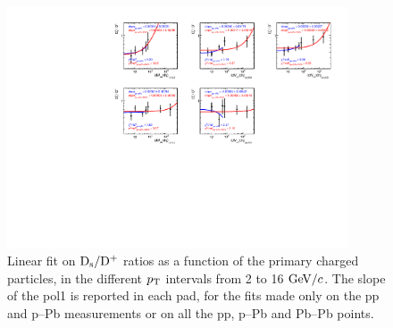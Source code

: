 \begin{figure}[h!]
    \begin{center}
          \includegraphics[width=0.9\textwidth]{./FigCap6/Fit_DsOverDplusVsMult_pp7TeV_pPb5TeV_PbPb5TeV.pdf}
    \end{center}
    \caption{Linear fit on ${\rm D_s}/{\rm D^+}$ ratios as a function of the primary charged particles, in the different $p_{\rm T}$ intervals from 2 to 16 $\mathrm{GeV}/c$. The slope of the pol1 is reported in each pad, for the fits made only on the pp and p--Pb measurements or on
    all the pp, p--Pb and Pb--Pb points.}
    \label{fig:FitRatios}
\end{figure}





